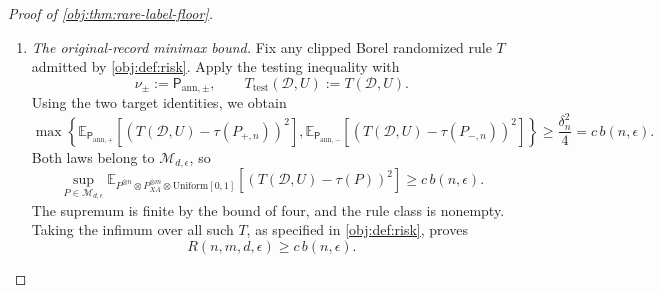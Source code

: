 \begin{proof}[Proof of \cref{obj:thm:rare-label-floor}]
\begin{enumerate}
\item \textit{The original-record minimax bound.}
Fix any clipped Borel randomized rule \(T\) admitted by
\cref{obj:def:risk}. Apply the testing inequality with
\[
\nu_\pm:=\mathsf P_{\mathrm{ann},\pm},
\qquad
T_{\mathrm{test}}(\mathcal D,U):=T(\mathcal D,U).
\]
Using the two target identities, we obtain
\[
\max\left\{
\mathbb E_{\mathsf P_{\mathrm{ann},+}}
[(T(\mathcal D,U)-\tau(P_{+,n}))^2],
\mathbb E_{\mathsf P_{\mathrm{ann},-}}
[(T(\mathcal D,U)-\tau(P_{-,n}))^2]
\right\}
\ge\frac{\delta_n^2}{4}
=c\,b(n,\epsilon).
\]
Both laws belong to \(\mathcal M_{d,\epsilon}\), so
\[
\sup_{P\in\mathcal M_{d,\epsilon}}
\mathbb E_{P^{\otimes n}\otimes P_{XA}^{\otimes m}
                   \otimes\mathrm{Uniform}[0,1]}
[(T(\mathcal D,U)-\tau(P))^2]
\ge c\,b(n,\epsilon).
\]
The supremum is finite by the bound of four, and the rule class is
nonempty. Taking the infimum over all such \(T\), as specified in
\cref{obj:def:risk}, proves
\[
R(n,m,d,\epsilon)\ge c\,b(n,\epsilon).
\]


\end{enumerate}
\end{proof}

